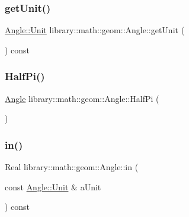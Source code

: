 \mbox{\label{classlibrary_1_1math_1_1geom_1_1_angle_a68d7f79c9c8111f4f3f4b44d0a9eea99}} 
\subsubsection{\texorpdfstring{get\+Unit()}{getUnit()}}
{\footnotesize\ttfamily \hyperlink{classlibrary_1_1math_1_1geom_1_1_angle_ab593c4dafbb9a5c29fdbe114eaae8eae}{Angle\+::\+Unit} library\+::math\+::geom\+::\+Angle\+::get\+Unit (\begin{DoxyParamCaption}{ }\end{DoxyParamCaption}) const}

\mbox{\label{classlibrary_1_1math_1_1geom_1_1_angle_a371dae83246cccba18dd418223873da4}} 
\subsubsection{\texorpdfstring{Half\+Pi()}{HalfPi()}}
{\footnotesize\ttfamily \hyperlink{classlibrary_1_1math_1_1geom_1_1_angle}{Angle} library\+::math\+::geom\+::\+Angle\+::\+Half\+Pi (\begin{DoxyParamCaption}{ }\end{DoxyParamCaption})\hspace{0.3cm}{\ttfamily [static]}}

\mbox{\label{classlibrary_1_1math_1_1geom_1_1_angle_ade7cdca64f1f5c6df4f9d1398eb36edc}} 
\subsubsection{\texorpdfstring{in()}{in()}}
{\footnotesize\ttfamily Real library\+::math\+::geom\+::\+Angle\+::in (\begin{DoxyParamCaption}\item[{const \hyperlink{classlibrary_1_1math_1_1geom_1_1_angle_ab593c4dafbb9a5c29fdbe114eaae8eae}{Angle\+::\+Unit} \&}]{a\+Unit }\end{DoxyParamCaption}) const}

